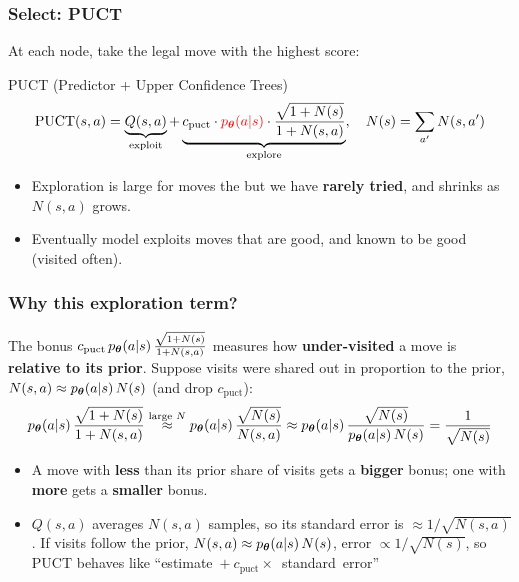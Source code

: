 \begin{frame}
    \frametitle{Select: PUCT}
    At each node, take the legal move with the highest score:
    \begin{block}{PUCT (Predictor + Upper Confidence Trees)}
        $$
        \text{PUCT}(s,a) = \underbrace{Q(s,a)}_{\text{exploit}}
        + \underbrace{c_{\text{puct}} \cdot \textcolor{red}{p_{{\boldsymbol{\theta}}}(a|s)} \cdot
        \frac{\sqrt{1 + N(s)}}{1 + N(s,a)}}_{\text{explore}},
        \quad N(s) = \sum_{a'} N(s,a')
        $$
    \end{block}
    \begin{itemize}
        \pause
        \item Exploration is large for moves the  but we have \textbf{rarely tried},
        and shrinks as $N(s,a)$ grows.
        \item Eventually model exploits moves that are good, and known to be good (visited often).
        \pause
    \end{itemize}
\end{frame}


\begin{frame}
    \frametitle{Why this exploration term?}
    The bonus $c_{\text{puct}} \, p_{\boldsymbol{\theta}}(a|s) \, \frac{\sqrt{1+N(s)}}{1 + N(s,a)}$ measures how \textbf{under-visited} a move is \textbf{relative to its prior}.
    Suppose visits were shared out in proportion to the prior, $N(s,a) \approx p_{\boldsymbol{\theta}}(a|s)\, N(s)$
    (and drop $c_{\text{puct}}$):
    $$
    p_{\boldsymbol{\theta}}(a|s) \, \frac{\sqrt{1+N(s)}}{1 + N(s,a)}
    \overset{\text{large } N}{\approx} p_{\boldsymbol{\theta}}(a|s) \, \frac{\sqrt{N(s)}}{N(s,a)}
    \approx p_{\boldsymbol{\theta}}(a|s) \, \frac{\sqrt{N(s)}}{p_{\boldsymbol{\theta}}(a|s)\, N(s)}
    = \frac{1}{\sqrt{N(s)}}
    $$
    \pause
    \begin{itemize}
        \item A move with \textbf{less} than its prior share of visits gets a \textbf{bigger} bonus;
        one with \textbf{more} gets a \textbf{smaller} bonus.
        \item $Q(s,a)$ averages $N(s,a)$ samples, so its standard error is $\approx 1/\sqrt{N(s,a)}$.
        If visits follow the prior, $N(s,a) \approx p_{\boldsymbol{\theta}}(a|s)\, N(s)$, error $\propto 1/\sqrt{N(s)}$, so PUCT behaves like
        \mbox{``estimate $+\ c_{\text{puct}} \times$ standard error''}
    \end{itemize}
\end{frame}


